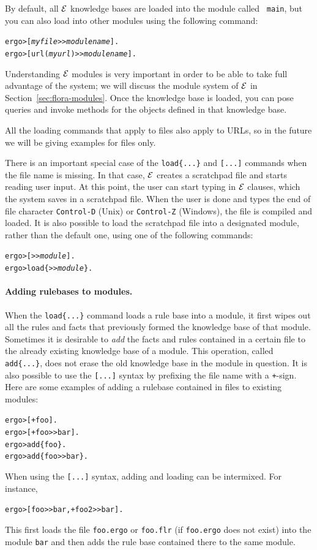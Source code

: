 \documentclass[11pt]{article}
\newcommand{\ERGO}{\mbox{\ensuremath{\cal{E}}\smaller{{\sc{RGO}}}}\xspace}
\newcommand{\FLSYSTEM}{\ERGO}
\newcommand{\prompt}{ergo> }
\newcommand{\flrext}{flr\xspace}
\newcommand{\ergoext}{ergo\xspace}
\begin{document}
By default, all \FLSYSTEM knowledge bases are loaded into the module called {\tt
  main}, but you can also load into other modules using the following
command:
\begin{alltt}
  \prompt  [\textnormal{\textit{myfile}}>{}>\textnormal{\textit{modulename}}].
  \prompt  [url(\textnormal{\textit{myurl}})>{}>\textnormal{\textit{modulename}}].
\end{alltt}
Understanding \FLSYSTEM modules is very important in order to be able to take
full advantage of the system; we will discuss the module system of \FLSYSTEM
in Section~\ref{sec:flora-modules}.  Once the knowledge base is loaded, you can
pose queries and invoke methods for the objects defined in that knowledge
base.

All the loading commands that apply to files also apply to URLs, so in the
future we will be giving examples for files only.

There is an important special case of the {\tt load\{...\}} and {\tt [...]}
commands when the file name is missing. In that case,
\FLSYSTEM creates a scratchpad file and starts reading user
input. At this point, the user can start typing in \FLSYSTEM clauses, which
the system saves in a scratchpad file. When the user is done and types the
end of file character {\tt Control-D} (Unix) or {\tt Control-Z} (Windows),
the file is compiled and loaded. It is also possible to load the scratchpad
file into a designated module, rather than the default one, using one of the
following commands:
\begin{alltt}
  \prompt [>{}>\textnormal{\emph{module}}].
  \prompt load\{>{}>\textnormal{\emph{module}}\}.
\end{alltt}

\paragraph{Adding rulebases to modules.}
When the {\tt load\{...\}} command loads a rule base into a module, it first wipes
out all the rules and facts that previously formed the knowledge base of
that module. Sometimes it is desirable to \emph{add} the facts and
rules contained in a certain file to the already existing knowledge base of
a module. This operation, called {\tt add\{...\}}, does not erase the old
knowledge base in the module in question.  It is also possible to use the
{\tt [...]} syntax by prefixing the file name with a {\tt +}-sign. Here are
some examples of adding a rulebase contained in files to existing
modules:
\index{\tt [file]}
\begin{alltt}
     \prompt [+foo].
     \prompt [+foo>{}>bar].
     \prompt add\{foo\}.
     \prompt add\{foo>{}>bar\}.
\end{alltt}
When using the {\tt [...]} syntax, adding and loading can be
intermixed. For instance, 
\begin{alltt}
      \prompt [foo>{}>bar, +foo2>{}>bar].
\end{alltt}
This first loads the file \texttt{foo.\ergoext} or
\texttt{foo.\flrext} (if \texttt{foo.\ergoext} does not exist)
into the module {\tt bar} and then
adds the rule base contained there to the same module.
\end{document}
